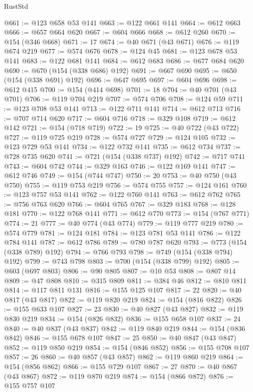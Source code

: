 \begin{lexlean}{RustStd}
\begin{coremodule}
@661 := @123 @658 @53 @141
@663 := @122 @661 @141
@664 := @612 @663
@666 := @657 @664 @620
@667 := @604 @666
@668 := @612 @260
@670 := @154 (@346 @668)
@671 := 17
@674 := @40 @671 (@43 @671)
@676 := @119 @674 @219
@677 := @574 @676
@678 := @124 @45
@681 := @123 @678 @53 @141
@683 := @122 @681 @141
@684 := @612 @683
@686 := @677 @684 @620
@690 := @670 (@154 (@338 @686) @192)
@691 := @667 @690
@695 := @650 (@154 (@338 @691) @192)
@696 := @647 @695
@697 := @604 @696
@698 := @612 @415
@700 := @154 (@414 @698)
@701 := 18
@704 := @40 @701 (@43 @701)
@706 := @119 @704 @219
@707 := @574 @706
@708 := @124 @59
@711 := @123 @708 @53 @141
@713 := @122 @711 @141
@714 := @612 @713
@716 := @707 @714 @620
@717 := @604 @716
@718 := @329 @108
@719 := @612 @142
@721 := @154 (@718 @719)
@722 := 19
@725 := @40 @722 (@43 @722)
@727 := @119 @725 @219
@728 := @574 @727
@729 := @124 @105
@732 := @123 @729 @53 @141
@734 := @122 @732 @141
@735 := @612 @734
@737 := @728 @735 @620
@741 := @721 (@154 (@338 @737) @192)
@742 := @717 @741
@743 := @604 @742
@744 := @329 @163
@746 := @122 @169 @141
@747 := @612 @746
@749 := @154 (@744 @747)
@750 := 20
@753 := @40 @750 (@43 @750)
@755 := @119 @753 @219
@756 := @574 @755
@757 := @124 @161
@760 := @123 @757 @53 @141
@762 := @122 @760 @141
@763 := @612 @762
@765 := @756 @763 @620
@766 := @604 @765
@767 := @329 @183
@768 := @128 @181
@770 := @122 @768 @141
@771 := @612 @770
@773 := @154 (@767 @771)
@774 := 21
@777 := @40 @774 (@43 @774)
@779 := @119 @777 @219
@780 := @574 @779
@781 := @124 @181
@784 := @123 @781 @53 @141
@786 := @122 @784 @141
@787 := @612 @786
@789 := @780 @787 @620
@793 := @773 (@154 (@338 @789) @192)
@794 := @766 @793
@798 := @749 (@154 (@338 @794) @192)
@799 := @743 @798
@803 := @700 (@154 (@338 @799) @192)
@805 := @603 (@697 @803)
@806 := @90 @805
@807 := @10 @53
@808 := @807 @14
@809 := @47 @808
@810 := @315 @809
@811 := @384 @46
@812 := @810 @811
@814 := @117 @811 @131
@816 := @155 @125 @107
@817 := 22
@820 := @40 @817 (@43 @817)
@822 := @119 @820 @219
@824 := @154 (@816 @822)
@826 := @155 @633 @107
@827 := 23
@830 := @40 @827 (@43 @827)
@832 := @119 @830 @219
@834 := @154 (@826 @832)
@836 := @155 @658 @107
@837 := 24
@840 := @40 @837 (@43 @837)
@842 := @119 @840 @219
@844 := @154 (@836 @842)
@846 := @155 @678 @107
@847 := 25
@850 := @40 @847 (@43 @847)
@852 := @119 @850 @219
@854 := @154 (@846 @852)
@856 := @155 @708 @107
@857 := 26
@860 := @40 @857 (@43 @857)
@862 := @119 @860 @219
@864 := @154 (@856 @862)
@866 := @155 @729 @107
@867 := 27
@870 := @40 @867 (@43 @867)
@872 := @119 @870 @219
@874 := @154 (@866 @872)
@876 := @155 @757 @107

\end{coremodule}
\end{lexlean}
